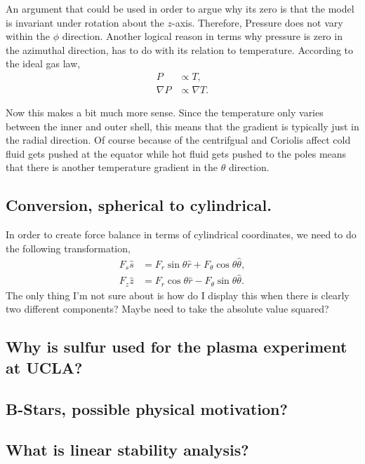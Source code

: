 An argument that could be used in order to argue why its zero is that the model is invariant under rotation about the $z$-axis. Therefore, Pressure does not vary within the $\phi$ direction. Another logical reason in terms why pressure is zero in the azimuthal direction, has to do with its relation to temperature. According to the ideal gas law, 
\begin{align}
	P &\propto T, \\
	\nabla P &\propto \nabla T.
\end{align} 

Now this makes a bit much more sense. Since the temperature only varies between the inner and outer shell, this means that the gradient is typically just in the radial direction. Of course because of the centrifgual and Coriolis affect cold fluid gets pushed at the equator while hot fluid gets pushed to the poles means that there is another temperature gradient in the $\theta$ direction.  


\subsection{Conversion, spherical to cylindrical.}
In order to create force balance in terms of cylindrical coordinates, we need to do the following transformation, 
\begin{align}
	F_s \hat{s} &= F_r \sin{\theta} \hat{r} + F_{\theta} \cos{\theta} \hat{\theta}, \\
	F_z \hat{z} &= F_r \cos{\theta} \hat{r} - F_{\theta} \sin{\theta} \hat{\theta}.
\end{align}
The only thing I'm not sure about is how do I display this when there is clearly two different components? Maybe need to take the absolute value squared? 

\subsection{Why is sulfur used for the plasma experiment at UCLA?}

\subsection{B-Stars, possible physical motivation?}

\subsection{What is linear stability analysis?}

